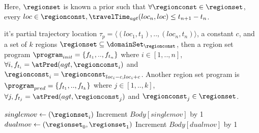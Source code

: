 Here, $\regionset$ is known a prior such that $\forall \regionconst \in \regionset$, every $loc \in \regionconst, \travelTime_{agt}(loc_n,loc)\leq t_{n+1} - t_n$. 



       it's partial trajectory location $\tau_{p} = \langle (loc_1, t_1),..,(loc_n, t_n) \rangle$,  a constant $c$, and a set of $k$ regions $\regionset \subseteq \domainSet_{\regionconst}$, then a region set program $\program_{init} =\{f_{t_1},..,f_{t_n}\} $ where $i \in [1,..,n]$, $\forall i, f_{t_i} = \atPred(agt, \regionconst_i) $ and $\regionconst_i = \regionconst_{loc_i-c,loc_i+c}$. Another region set program is $\program_{pred} =\{f_{t_1},..,f_{t_k}\} $ where $j \in [1,..,k]$, $\forall j, f_{t_j} = \atPred(agt, \regionconst_j) $ and $\regionconst_j \in \regionset$.


             
                \State $singlemov \gets (\regionset_i)$
                \State Increment $Body[singlemov]$ by 1
            \EndFor
            \For{$\regionset_0 \in \regionset_{\trajectory[n - 1]}$} 
                \For{$\regionset_1 \in \regionset_{\trajectory[n]}$}
                    \State $dualmov \gets (\regionset_0, \regionset_1)$
                    \State Increment $Body[dualmov]$ by 1
                \EndFor



